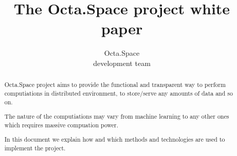 \documentclass[a4paper]{article}
\begin{document}
\title{The Octa.Space project white paper}

\author{Octa.Space\\development team}

\maketitle

\begin{abstract}
Octa.Space project aims to provide the functional and transparent way to perform computiations in distributed environment,
to store/serve any amounts of data and so on.

The nature of the computiations may vary from machine learning to any other ones which requires massive compuation power.

In this document we explain how and which methods and technologies are used to implement the project.

\end{abstract}









\end{document}
